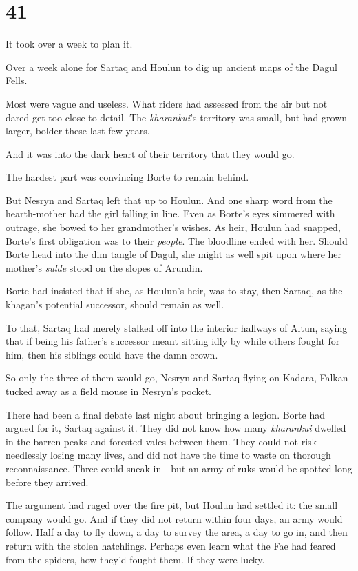 
\chapter{41}

It took over a week to plan it.

Over a week alone for Sartaq and Houlun to dig up ancient maps of the Dagul Fells.

Most were vague and useless. What riders had assessed from the air but not dared get too close to detail. The \emph{kharankui}'s territory was small, but had grown larger, bolder these last few years.

And it was into the dark heart of their territory that they would go.

The hardest part was convincing Borte to remain behind.

But Nesryn and Sartaq left that up to Houlun. And one sharp word from the hearth-mother had the girl falling in line. Even as Borte's eyes simmered with outrage, she bowed to her grandmother's wishes. As heir, Houlun had snapped, Borte's first obligation was to their \emph{people}. The bloodline ended with her. Should Borte head into the dim tangle of Dagul, she might as well spit upon where her mother's \emph{sulde} stood on the slopes of Arundin.

Borte had insisted that if she, as Houlun's heir, was to stay, then Sartaq, as the khagan's potential successor, should remain as well.

To that, Sartaq had merely stalked off into the interior hallways of Altun, saying that if being his father's successor meant sitting idly by while others fought for him, then his siblings could have the damn crown.

So only the three of them would go, Nesryn and Sartaq flying on Kadara, Falkan tucked away as a field mouse in Nesryn's pocket.

There had been a final debate last night about bringing a legion. Borte had argued for it, Sartaq against it. They did not know how many
\emph{kharankui} dwelled in the barren peaks and forested vales between them. They could not risk needlessly losing many lives, and did not have the time to waste on thorough reconnaissance. Three could sneak in---but an army of ruks would be spotted long before they arrived.

The argument had raged over the fire pit, but Houlun had settled it: the small company would go. And if they did not return within four days, an army would follow. Half a day to fly down, a day to survey the area, a day to go in, and then return with the stolen hatchlings. Perhaps even learn what the Fae had feared from the spiders, how they'd fought them. If they were lucky.

